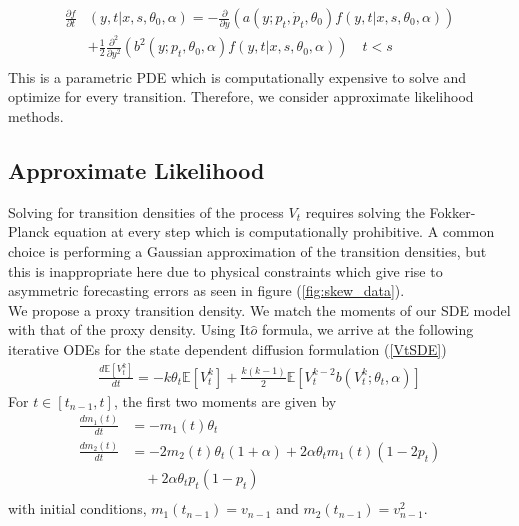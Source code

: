 \documentclass[10pt,twocolumn,letterpaper]{article}
\newcommand{\E}{\mathbb{E}}
\begin{document}
\begin{equation}
\begin{split}
\frac{ \partial f }{\partial t } & (y ,t | x , s, \theta_0 , \alpha )= - \frac{\partial}{ \partial y} ( a( y;  p_t, \dot{p}_t, \theta_0 ) f( y ,t | x , s, \theta_0  , \alpha ) ) \\
& + \frac{1}{2} \frac{\partial^2}{ \partial y^2} ( b^2(y; p_t, \theta_0, \alpha  )  f(y ,t | x , s,\theta_0 , \alpha ) ) \quad  t < s\\
\end{split}
\end{equation}
This is a parametric PDE which is computationally expensive to solve and optimize for every transition. Therefore, we consider approximate likelihood methods.

\subsection{Approximate Likelihood}
Solving for transition densities of the process $V_t$ requires solving the Fokker-Planck equation at every step which is computationally prohibitive. A common choice is performing a Gaussian approximation of the transition densities, but this is inappropriate here due to physical constraints which give rise to asymmetric forecasting errors as seen in figure (\ref{fig:skew_data}).\\

We propose a proxy transition density. We match the moments of our SDE model with that of the proxy density. Using It$\hat{o}$ formula, we arrive at the following iterative ODEs for the state dependent diffusion formulation (\ref{VtSDE})
\begin{equation}
\begin{split}
\frac{d \E[ V^k_t]}{dt} = - k \theta_t \E [ V^k_t] + \frac{k(k-1)}{2} \E [ V^{k-2}_t  b(V^k_t;\theta_t, \alpha)]
\end{split}
\end{equation}
For $t\in [t_{n-1}, t]$, the first two moments are given by
\begin{equation}
\begin{split}
\frac{d m_1 (t)}{dt} &= - m_1(t)\theta_t \\
\frac{d m_2 (t)}{dt} &=  -2 m_2(t)\theta_t(1+\alpha) + 2\alpha\theta_t m_1(t)(1-2p_t) \\
&\quad + 2 \alpha\theta_t p_t (1-p_t)\\
\end{split}
\end{equation}
with initial conditions, $m_1(t_{n-1})= v_{n-1}$ and $m_2(t_{n-1})= v_{n-1}^2$.
\end{document}
